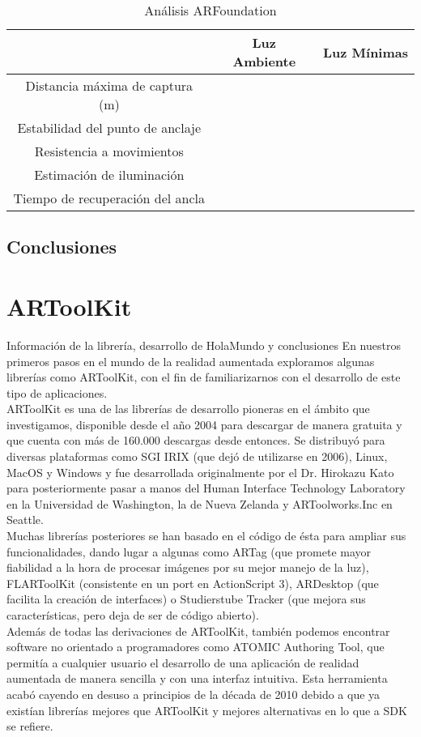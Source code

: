 \begin{table}[H]
    \centering
    \begin{tabular}{|c|c|c|}
    \hline
          & Luz Ambiente & Luz Mínimas \\
         \hline
        Distancia máxima de captura (m)  & &\\
        \hline
        Estabilidad del punto de anclaje  & &\\
        \hline
        Resistencia a movimientos  & & \\
        \hline
        Estimación de iluminación  & & \\
        \hline
        Tiempo de recuperación del ancla  & & \\
      \hline
    \end{tabular}
    \caption{Análisis ARFoundation}
    \label{tab:ARFoundation}
\end{table}
\subsection{Conclusiones}

\clearpage
\section{ARToolKit}
Información de la librería, desarrollo de HolaMundo y conclusiones
En nuestros primeros pasos en el mundo de la realidad aumentada exploramos algunas librerías como ARToolKit, con el fin de familiarizarnos con el desarrollo de este tipo de aplicaciones.\\

ARToolKit es una de las librerías de desarrollo pioneras en el ámbito que investigamos, disponible desde el año 2004 para descargar de manera gratuita y que cuenta con más de 160.000 descargas desde entonces. Se distribuyó para diversas plataformas como SGI IRIX (que dejó de utilizarse en 2006), Linux, MacOS y Windows y fue desarrollada originalmente por el Dr. Hirokazu Kato para posteriormente pasar a manos del Human Interface Technology Laboratory en la Universidad de Washington, la de Nueva Zelanda y ARToolworks.Inc en Seattle.\\

Muchas librerías posteriores se han basado en el código de ésta para ampliar sus funcionalidades, dando lugar a algunas como ARTag (que promete mayor fiabilidad a la hora de procesar imágenes por su mejor manejo de la luz), FLARToolKit (consistente en un port en ActionScript 3), ARDesktop (que facilita la creación de interfaces) o Studierstube Tracker (que mejora sus características, pero deja de ser de código abierto).\\
Además de todas las derivaciones de ARToolKit, también podemos encontrar software no orientado a programadores como ATOMIC Authoring Tool, que permitía a cualquier usuario el desarrollo de una aplicación de realidad aumentada de manera sencilla y con una interfaz intuitiva. Esta herramienta acabó cayendo en desuso a principios de la década de 2010 debido a que ya existían librerías mejores que ARToolKit y mejores alternativas en lo que a SDK se refiere.\\

